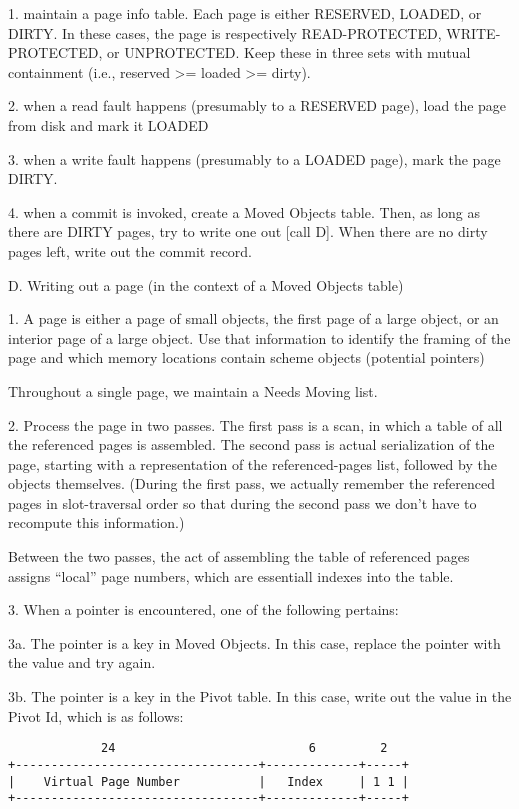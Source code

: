 \documentclass[10pt,letterpaper]{article}
\begin{document}
1. maintain a page info table.  Each page is either RESERVED, LOADED,
   or DIRTY.  In these cases, the page is respectively READ-PROTECTED,
   WRITE-PROTECTED, or UNPROTECTED.  Keep these in three sets with
   mutual containment (i.e., reserved >= loaded >= dirty).

2. when a read fault happens (presumably to a RESERVED page), load the
   page from disk and mark it LOADED

3. when a write fault happens (presumably to a LOADED page), mark the
   page DIRTY.

4. when a commit is invoked, create a Moved Objects table.  Then, as long
   as there are DIRTY pages, try to write one out [call D].  When there
   are no dirty pages left, write out the commit record.

D. Writing out a page (in the context of a Moved Objects table)

1. A page is either a page of small objects, the first page of a large
   object, or an interior page of a large object.  Use that information
   to identify the framing of the page and which memory locations contain
   scheme objects (potential pointers)

   Throughout a single page, we maintain a Needs Moving list.

2. Process the page in two passes.  The first pass is a scan, in which
   a table of all the referenced pages is assembled.  The second pass
   is actual serialization of the page, starting with a representation
   of the referenced-pages list, followed by the objects themselves.
   (During the first pass, we actually remember the referenced pages
   in slot-traversal order so that during the second pass we don't have
   to recompute this information.)

   Between the two passes, the act of assembling the table of referenced
   pages assigns ``local'' page numbers, which are essentiall indexes into
   the table.


3. When a pointer is encountered, one of the following pertains:

3a. The pointer is a key in Moved Objects.  In this case, replace
    the pointer with the value and try again.

3b. The pointer is a key in the Pivot table.  In this case, write out
    the value in the Pivot Id, which is as follows:

\begin{verbatim}
             24                           6         2
+----------------------------------+-------------+-----+
|    Virtual Page Number           |   Index     | 1 1 |
+----------------------------------+-------------+-----+
\end{verbatim}
\end{document}
